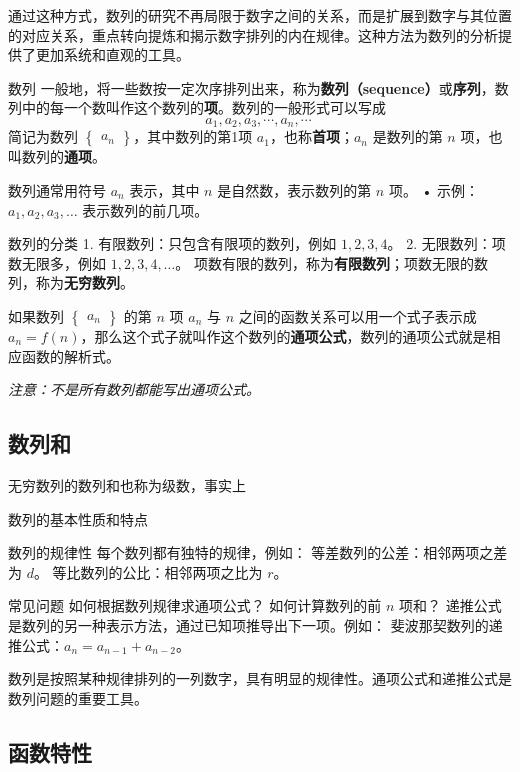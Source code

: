 通过这种方式，数列的研究不再局限于数字之间的关系，而是扩展到数字与其位置的对应关系，重点转向提炼和揭示数字排列的内在规律。这种方法为数列的分析提供了更加系统和直观的工具。


\begin{definition}{数列}
一般地，将一些数按一定次序排列出来，称为\textbf{数列（sequence）}或\textbf{序列}，数列中的每一个数叫作这个数列的\textbf{项}。数列的一般形式可以写成
\begin{equation}
a_1,a_2,a_3,\cdots,a_n,\cdots~
\end{equation}
简记为数列 $\begin{Bmatrix} a_n \end{Bmatrix}$，其中数列的第1项 $a_1$，也称\textbf{首项}；$a_n$ 是数列的第 $n$ 项，也叫数列的\textbf{通项}。
\end{definition}


数列通常用符号 $a_n$ 表示，其中 $n$ 是自然数，表示数列的第 $n$ 项。
	•	示例：$a_1, a_2, a_3, \dots$ 表示数列的前几项。

数列的分类
	1.	有限数列：只包含有限项的数列，例如 $1, 2, 3, 4$。
	2.	无限数列：项数无限多，例如 $1, 2, 3, 4, \dots$。
项数有限的数列，称为\textbf{有限数列}；项数无限的数列，称为\textbf{无穷数列}。

如果数列 $\begin{Bmatrix} a_n \end{Bmatrix}$ 的第 $n$ 项 $a_n$ 与 $n$ 之间的函数关系可以用一个式子表示成 $a_n = f(n)$，那么这个式子就叫作这个数列的\textbf{通项公式}，数列的通项公式就是相应函数的解析式。

\textsl{注意：不是所有数列都能写出通项公式。}

\subsection{数列和}

无穷数列的数列和也称为级数，事实上


数列的基本性质和特点

数列的规律性
每个数列都有独特的规律，例如：
等差数列的公差：相邻两项之差为 $d$。
等比数列的公比：相邻两项之比为 $r$。

常见问题
如何根据数列规律求通项公式？
如何计算数列的前 $n$ 项和？
递推公式是数列的另一种表示方法，通过已知项推导出下一项。例如：
斐波那契数列的递推公式：$a_n = a_{n-1} + a_{n-2}$。

数列是按照某种规律排列的一列数字，具有明显的规律性。通项公式和递推公式是数列问题的重要工具。
\subsection{函数特性}

